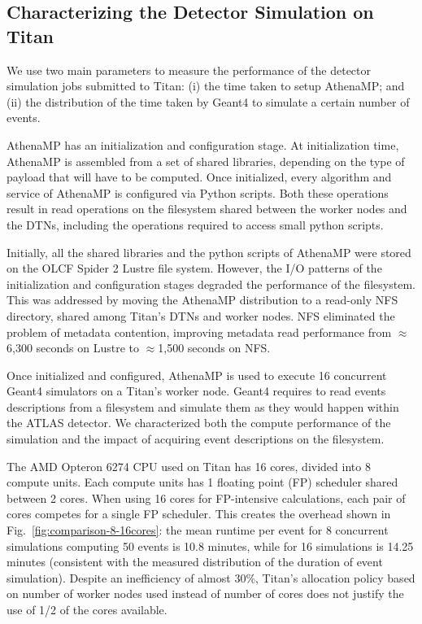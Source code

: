 \subsection{Characterizing the Detector Simulation on Titan}
\label{ssec:athenamp_titan}

We use two main parameters to measure the performance of the detector
simulation jobs submitted to Titan: (i) the time taken to setup AthenaMP\@;
and (ii) the distribution of the time taken by Geant4 to simulate
a certain number of events.

AthenaMP has an initialization and configuration stage. At initialization
time, AthenaMP is assembled from a set of shared libraries, depending on the
type of payload that will have to be computed. Once initialized, every
algorithm and service of AthenaMP is configured via Python scripts. Both
these operations result in read operations on the filesystem shared between
the worker nodes and the DTNs, including the operations required to access
small python scripts.

Initially, all the shared libraries and the python scripts of AthenaMP were
stored on the OLCF Spider 2 Lustre file system. However, the I/O patterns of
the initialization and configuration stages degraded the performance of the
filesystem. This was addressed by moving the AthenaMP distribution to a
read-only NFS directory, shared among Titan's DTNs and worker nodes. NFS
eliminated the problem of metadata contention, improving metadata read
performance from $\approx$6,300 seconds on Lustre to $\approx$1,500 seconds
on NFS\@.

Once initialized and configured, AthenaMP is used to execute 16 concurrent
Geant4 simulators on a Titan's worker node. Geant4 requires to read events
descriptions from a filesystem and simulate them as they would happen within
the ATLAS detector. We characterized both the compute performance of the
simulation and the impact of acquiring event descriptions on the filesystem.

The AMD Opteron 6274 CPU used on Titan has 16 cores, divided into 8 compute
units. Each compute units has 1 floating point (FP) scheduler shared between
2 cores. When using 16 cores for FP-intensive calculations, each pair of
cores competes for a single FP scheduler. This creates the overhead shown in
Fig.~\ref{fig:comparison-8-16cores}: the mean runtime per event for 8
concurrent simulations computing 50 events is 10.8 minutes, while for 16
simulations is 14.25 minutes (consistent with the measured distribution of
the duration of event simulation). Despite an inefficiency of almost 30\%,
Titan's allocation policy based on number of worker nodes used instead of
number of cores does not justify the use of 1/2 of the cores available.

